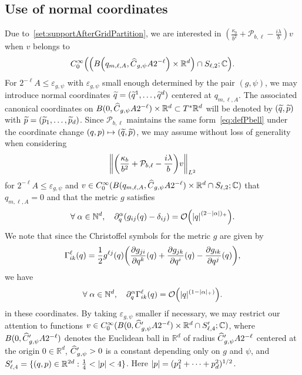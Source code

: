 \documentclass[10pt]{amsart}
\theoremstyle{definition}\newtheorem{defi}[theo]{Definition}\newtheorem{rema}[theo]{Remark}\newtheorem{exam}[theo]{Example}\newtheorem{exem}[theo]{Example}\newtheorem{nota}[theo]{Notation}
\newcommand{\C}{\mathbb{C}}
\newcommand{\R}{\mathbb{R}}
\newcommand{\N}{\mathbb{N}}
\newcommand{\clO}{\mathcal{O}}
\newcommand{\clP}{\mathcal{P}}
\newcommand{\p}{\partial}
\newcommand{\abs}[1]{\left| #1 \right|}
\newcommand\norm[1]{\left\lVert#1\right\rVert}
\let\oldtilde\tilde
\renewcommand*{\tilde}[1]{\mathchoice{\widetilde{#1}}{\widetilde{#1}}{\oldtilde{#1}}{\oldtilde{#1}}}
\let\oldhat\hat
\renewcommand*{\hat}[1]{\mathchoice{\widehat{#1}}{\widehat{#1}}{\oldhat{#1}}{\oldhat{#1}}}
\let\oldforall\forall
\renewcommand*{\forall}{\mathrel{\oldforall}}
\let\originalleft\left
\let\originalright\right
\renewcommand{\left}{\mathopen{}\mathclose\bgroup\originalleft}
\renewcommand{\right}{\aftergroup\egroup\originalright}
\let\oldmapsto\mapsto
\renewcommand*{\mapsto}{\mathchoice{\longmapsto}{\oldmapsto}{\oldmapsto}{\oldmapsto}}
\begin{document}
\subsection{Use of normal coordinates}\label{subsec:NormalCoordinate}
Due to~\eqref{set:supportAfterGridPartition}, we are interested in $(\frac{\kappa_b}{b^2}+\clP_{b, \ell} - \frac{i \lambda}{b}) v$ when $v$ belongs to
\[
C^\infty_0\left(\left(B\left(q_{m,\ell,A}, \hat{C}_{g,\psi}A2^{-\ell}\right)\times \R^d\right)\cap S_{\ell,2};\mathbb{C}\right).
\]
For $2^{-\ell}A\leq \varepsilon_{g,\psi}$ with $\varepsilon_{g,\psi}$ small enough determined by the pair $(g,\psi)$, we may introduce normal coordinates $\tilde{q} = (\tilde{q}^1, \dots, \tilde{q}^d)$ centered at $q_{m, \ell, A}$. The associated canonical coordinates on $B(0, \hat{C}_{g, \psi} A 2^{-\ell}) \times \R^d \subset T^* \R^d$ will be denoted by $(\tilde{q}, \tilde{p})$ with $\tilde{p} = (\tilde{p}_1, \dots, \tilde{p}_d)$. Since $\clP_{b, \ell}$ maintains the same form~\eqref{eq:defPbell} under the coordinate change $(q,p) \mapsto (\tilde{q}, \tilde{p})$, we may assume without loss of generality when considering
\begin{align}\label{quantity_to_bound_below}
\norm{\left(\frac{\kappa_b}{b^2}+\clP_{b,\ell}-\frac{i \lambda}{b}\right) v}_{L^2}
\end{align}
for $2^{-\ell}A \leq \varepsilon_{g, \psi}$ and $v \in C^\infty_0(B(q_{m,\ell,A}, \hat{C}_{g,\psi}A2^{-\ell})\times \R^d \cap S_{\ell,2}; \C)$ that $q_{m, \ell, A} = 0$ and that the metric $g$ satisfies
\begin{equation}\label{eq:BoundForTheMetricInNormalCoordinate}
\forall \alpha \in \N^d, \quad \p^\alpha_q \left(g_{ij}(q)-\delta_{ij}\right) = \clO\left(\abs{q}^{(2-\abs{\alpha})_{+}}\right).
\end{equation}
We note that since the Christoffel symbols for the metric $g$ are given by
\begin{equation}
\Gamma_{ik}^{\ell}(q) = \frac{1}{2}g^{\ell j}(q)\left(\frac{\partial g_{j i}}{\partial q^{k}}(q) + \frac{\partial g_{jk}}{\partial q^{i}}(q) - \frac{\partial g_{ik}}{\partial q^{j}}(q)\right),
\end{equation}
we have
\begin{equation}\label{eq:BoundForTheChristoffelSymbolInNormalCoordinate}
\forall \alpha \in \N^d, \quad \partial_q^{\alpha}\Gamma_{ik}^{\ell}(q) = {\clO}\left(|q|^{(1-|\alpha|_+)}\right).
\end{equation}
in these coordinates. By taking $\varepsilon_{g, \psi}$ smaller if necessary, we may restrict our attention to functions $v \in C^\infty_0(B(0, \hat{C}'_{g, \psi} A 2^{-\ell}) \times \R^d \cap S'_{\ell,4}; \C)$, where $B(0, \hat{C}'_{g, \psi} A 2^{-\ell})$ denotes the Euclidean ball in $\R^d$ of radius $\hat{C}'_{g, \psi} A 2^{-\ell}$ centered at the origin $0 \in \R^d$, $\hat{C}'_{g, \psi}>0$ is a constant depending only on $g$ and $\psi$, and $S'_{\ell,4} = \{(q,p) \in \R^{2d}:\frac{1}{4}<\abs{p}<4\}$. Here $\abs{p} = (p_1^2+\dots+p_d^2)^{1/2}$.
\end{document}
